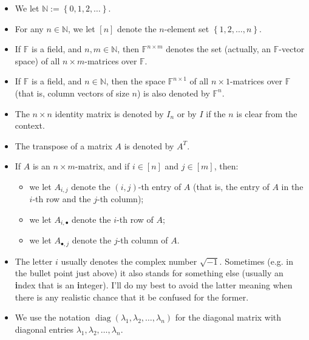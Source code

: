 \documentclass[numbers=enddot,12pt,final,onecolumn,notitlepage]{scrartcl}%
\numberwithin{exer}{subsection}
\theoremstyle{definition}
\begin{document}
\begin{itemize}
\item We let $\mathbb{N}:=\left\{  0,1,2,\ldots\right\}  $.

\item For any $n\in\mathbb{N}$, we let $\left[  n\right]  $ denote the
$n$-element set $\left\{  1,2,\ldots,n\right\}  $.

\item If $\mathbb{F}$ is a field, and $n,m\in\mathbb{N}$, then $\mathbb{F}%
^{n\times m}$ denotes the set (actually, an $\mathbb{F}$-vector space) of all
$n\times m$-matrices over $\mathbb{F}$.

\item If $\mathbb{F}$ is a field, and $n\in\mathbb{N}$, then the space
$\mathbb{F}^{n\times1}$ of all $n\times1$-matrices over $\mathbb{F}$ (that is,
column vectors of size $n$) is also denoted by $\mathbb{F}^{n}$.

\item The $n\times n$ identity matrix is denoted by $I_{n}$ or by $I$ if the
$n$ is clear from the context.

\item The transpose of a matrix $A$ is denoted by $A^{T}$.

\item If $A$ is an $n\times m$-matrix, and if $i\in\left[  n\right]  $ and
$j\in\left[  m\right]  $, then:

\begin{itemize}
\item we let $A_{i,j}$ denote the $\left(  i,j\right)  $-th entry of $A$ (that
is, the entry of $A$ in the $i$-th row and the $j$-th column);

\item we let $A_{i,\bullet}$ denote the $i$-th row of $A$;

\item we let $A_{\bullet,j}$ denote the $j$-th column of $A$.
\end{itemize}

\item The letter $i$ usually denotes the complex number $\sqrt{-1}$. Sometimes
(e.g. in the bullet point just above) it also stands for something else
(usually an \textbf{i}ndex that is an \textbf{i}nteger). I'll do my best to
avoid the latter meaning when there is any realistic chance that it be
confused for the former.

\item We use the notation $\operatorname*{diag}\left(  \lambda_{1},\lambda
_{2},\ldots,\lambda_{n}\right)  $ for the diagonal matrix with diagonal
entries $\lambda_{1},\lambda_{2},\ldots,\lambda_{n}$.
\end{itemize}
\end{document}
